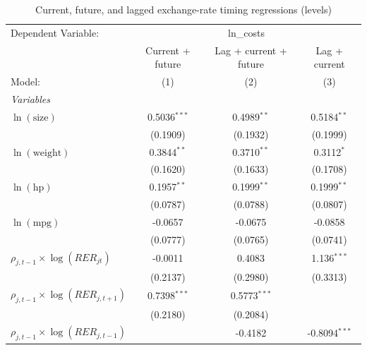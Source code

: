 
\begin{table}[htbp]
   \caption{\label{tab:cost_reg_timing_triplet_levels} Current, future, and lagged exchange-rate timing regressions (levels)}
   \centering
   \begin{tabular}{lccc}
      \tabularnewline \midrule \midrule
      Dependent Variable: & \multicolumn{3}{c}{ln\_costs}\\
                                               & Current + future & Lag + current + future & Lag + current \\
      Model:                                   & (1)            & (2)            & (3)\\
      \midrule
      \emph{Variables}\\
      $\ln(\text{size})$                       & 0.5036$^{***}$   & 0.4989$^{**}$          & 0.5184$^{**}$\\
                                               & (0.1909)         & (0.1932)               & (0.1999)\\
      $\ln(\text{weight})$                     & 0.3844$^{**}$    & 0.3710$^{**}$          & 0.3112$^{*}$\\
                                               & (0.1620)         & (0.1633)               & (0.1708)\\
      $\ln(\text{hp})$                         & 0.1957$^{**}$    & 0.1999$^{**}$          & 0.1999$^{**}$\\
                                               & (0.0787)         & (0.0788)               & (0.0807)\\
      $\ln(\text{mpg})$                        & -0.0657          & -0.0675                & -0.0858\\
                                               & (0.0777)         & (0.0765)               & (0.0741)\\
      $\rho_{j,t-1}\times\log(RER_{jt})$       & -0.0011          & 0.4083                 & 1.136$^{***}$\\
                                               & (0.2137)         & (0.2980)               & (0.3313)\\
      $\rho_{j,t-1}\times\log(RER_{j,t+1})$    & 0.7398$^{***}$   & 0.5773$^{***}$         &   \\
                                               & (0.2180)         & (0.2084)               &   \\
      $\rho_{j,t-1}\times\log(RER_{j,t-1})$    &                  & -0.4182                & -0.8094$^{***}$\\

\end{tabular}
\end{table}
